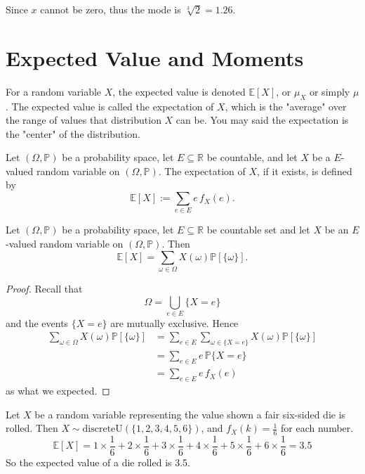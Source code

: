 Since $x$ cannot be zero, thus the mode is $\sqrt[3]{2} = 1.26$.

\section{Expected Value and Moments}

For a random variable $X$, the expected value is denoted $\mathbb{E}[X]$, or $\mu_X$ or simply $\mu$.
The expected value is called the expectation of $X$, which is the "average" over the range of values 
that distribution $X$ can be. You may said the expectation is the "center" of the distribution.

\begin{definition}
    Let $(\Omega, \mathbb{P})$ be a probability space, let $E \subseteq \mathbb{R}$ be countable, 
    and let $X$ be a $E$-valued random variable on $(\Omega, \mathbb{P})$. The expectation of $X$, if it exists, is 
    defined by 
    \begin{equation}
        \mathbb{E}[X] := \sum_{e \in E} e\, f_X(e).
    \end{equation}
\end{definition}

\begin{lemma}
    Let $(\Omega, \mathbb{P})$ be a probability space, let $E \subseteq \mathbb{R}$ be countable set and 
    let $X$ be an $E$-valued random variable on $(\Omega, \mathbb{P})$. Then 
    \[
        \mathbb{E}[X] = \sum_{\omega \in \Omega} X(\omega) \mathbb{P}[\{ \omega \}].
    \]
\end{lemma}
\begin{proof}
    Recall that 
    \[
        \Omega = \bigcup_{e \in E} \{ X = e \}
    \]
    and the events $\{ X = e \}$ are mutually exclusive. Hence
    \begin{align*}
        \sum_{\omega \in \Omega} X(\omega) \mathbb{P}[\{ \omega \}] &= 
        \sum_{e \in E} \sum_{\omega \in \{X = e\} } X(\omega) \mathbb{P}[\{ \omega \}]\\
        &= \sum_{e \in E} e \, \mathbb{P}\{ X = e \}\\
        &= \sum_{e \in E} e\, f_X(e)
    \end{align*}
    as what we expected.
\end{proof}

\begin{example}
    Let $X$ be a random variable representing the value shown a fair six-sided die is rolled.
    Then $X \sim \text{discreteU}(\{1,2,3,4,5,6\})$, and $f_X(k) = \frac{1}{6}$ for each number.
    \[
        \mathbb{E}[X] = 1 \times \frac{1}{6} + 2 \times \frac{1}{6} + 3 \times \frac{1}{6} 
        + 4 \times \frac{1}{6} + 5 \times \frac{1}{6} + 6 \times \frac{1}{6} = 3.5
    \]
    So the expected value of a die rolled is 3.5.
\end{example}


